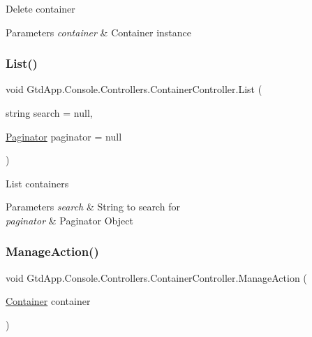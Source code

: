 Delete container 


\begin{DoxyParams}{Parameters}
{\em container} & Container instance\\
\hline
\end{DoxyParams}
\mbox{\label{class_gtd_app_1_1_console_1_1_controllers_1_1_container_controller_ad94aec28f62311b1b157b6776a0d0845}} 
\subsubsection{\texorpdfstring{List()}{List()}}
{\footnotesize\ttfamily void Gtd\+App.\+Console.\+Controllers.\+Container\+Controller.\+List (\begin{DoxyParamCaption}\item[{string}]{search = {\ttfamily null},  }\item[{\mbox{\hyperlink{class_gtd_app_1_1_repository_1_1_paginator}{Paginator}}}]{paginator = {\ttfamily null} }\end{DoxyParamCaption})}



List containers 


\begin{DoxyParams}{Parameters}
{\em search} & String to search for\\
\hline
{\em paginator} & Paginator Object\\
\hline
\end{DoxyParams}
\mbox{\label{class_gtd_app_1_1_console_1_1_controllers_1_1_container_controller_a1d1878b44eed9a95adb3352436b30eb8}} 
\subsubsection{\texorpdfstring{Manage\+Action()}{ManageAction()}}
{\footnotesize\ttfamily void Gtd\+App.\+Console.\+Controllers.\+Container\+Controller.\+Manage\+Action (\begin{DoxyParamCaption}\item[{\mbox{\hyperlink{class_gtd_app_1_1_data_1_1_container}{Container}}}]{container }\end{DoxyParamCaption})}



